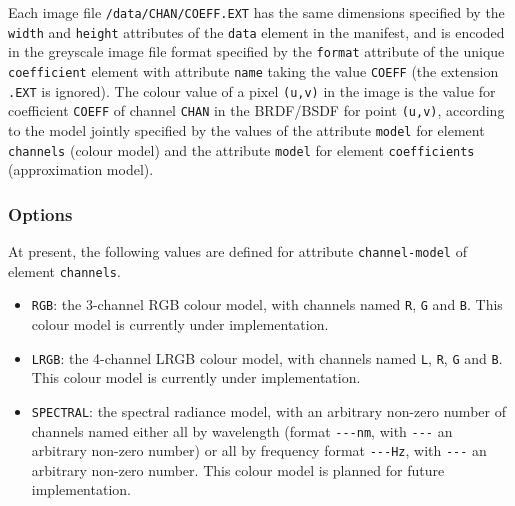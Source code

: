 Each image file \texttt{/data/CHAN/COEFF.EXT} has the same dimensions
specified by the \texttt{width} and \texttt{height} attributes of the
\texttt{data} element in the manifest, and is encoded in the greyscale
image file format specified by the \texttt{format} attribute of the
unique \texttt{coefficient} element with attribute \texttt{name} taking
the value \texttt{COEFF} (the extension \texttt{.EXT} is ignored). The
colour value of a pixel \texttt{(u,v)} in the image is the value for
coefficient \texttt{COEFF} of channel \texttt{CHAN} in the BRDF/BSDF for
point \texttt{(u,v)}, according to the model jointly specified by the
values of the attribute \texttt{model} for element \texttt{channels}
(colour model) and the attribute \texttt{model} for element
\texttt{coefficients} (approximation model).

\hypertarget{options}{%
\subsubsection{Options}\label{options}}

At present, the following values are defined for attribute
\texttt{channel-model} of element \texttt{channels}.
\begin{itemize}
\item \texttt{RGB}: the
3-channel RGB colour model, with channels named \texttt{R}, \texttt{G}
and \texttt{B}. This colour model is currently under implementation.
\item \texttt{LRGB}: the 4-channel LRGB colour model, with channels named
\texttt{L}, \texttt{R}, \texttt{G} and \texttt{B}. This colour model is
currently under implementation.
\item \texttt{SPECTRAL}: the spectral
radiance model, with an arbitrary non-zero number of channels named
either all by wavelength (format \texttt{-\/-\/-nm}, with
\texttt{-\/-\/-} an arbitrary non-zero number) or all by frequency
format \texttt{-\/-\/-Hz}, with \texttt{-\/-\/-} an arbitrary non-zero
number. This colour model is planned for future implementation.
\end{itemize}

